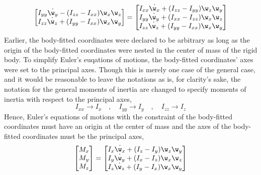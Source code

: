 \documentclass[a4paper, 12pt]{report}
\begin{document}
\begin{center}
$$\begin{bmatrix}
I_{yy}\dot{\w_y} - (I_{zz} - I_{xx})\w_x\w_z\\
I_{zz}\dot{\w_z} + (I_{yy} - I_{xx})\w_x\w_y
\end{bmatrix} = \begin{bmatrix} 
I_{xx}\dot{\w_x} + (I_{zz} - I_{yy})\w_z\w_y\\
I_{yy}\dot{\w_y} + (I_{xx} - I_{zz})\w_x\w_z\\
I_{zz}\dot{\w_z} + (I_{yy} - I_{xx})\w_x\w_y
\end{bmatrix}$$
Earlier, the body-fitted coordinates were declared to be arbitrary as long as the origin of the body-fitted coordinates were nested in the center of mass of the rigid body. To simplify Euler's euqations of motions, the body-fitted coordinates' axes were set to the principal axes. Though this is merely one case of the general case, and it would be reasonable to leave the notations as is, for clarity's sake, the notation for the general moments of inertia are changed to specify moments of inertia with respect to the principal axes,
$$I_{xx}\to I_x \quad,\quad I_{yy}\to I_y \quad,\quad I_{zz}\to I_z$$
Hence, Euler's equations of motions with the constraint of the body-fitted coordinates must have an origin at the center of mass and the axes of the body-fitted coordinates must be the principal axes,
$$\begin{bmatrix}M_x \\ M_y \\ M_z\end{bmatrix} = \begin{bmatrix} 
I_{x}\dot{\w_x} + (I_{z} - I_{y})\w_z\w_y\\
I_{y}\dot{\w_y} + (I_{x} - I_{z})\w_x\w_z\\
I_{z}\dot{\w_z} + (I_{y} - I_{x})\w_x\w_y
\end{bmatrix}$$



\end{center}
\end{document}
